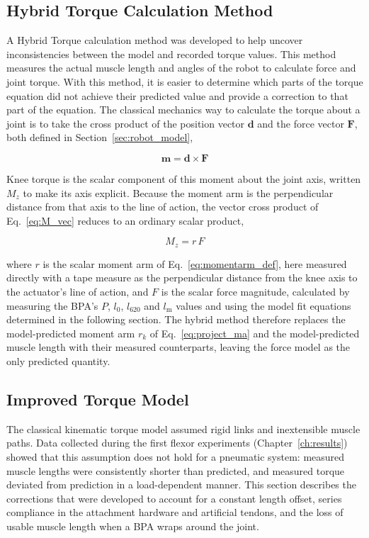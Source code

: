 \subsection{Hybrid Torque Calculation Method}\label{sec:hybrid_method}


A Hybrid Torque calculation method was developed to help uncover inconsistencies between the model and recorded torque values. This method measures the actual muscle length and angles of the robot to calculate force and joint torque. With this method, it is easier to determine which parts of the torque equation did not achieve their predicted value and provide a correction to that part of the equation. The classical mechanics way to calculate the torque about a joint is to take the cross product of the position vector $\mathbf{d}$ and the force vector $\mathbf{F}$, both defined in Section~\ref{sec:robot_model},

\begin{equation}
    \mathbf{m} = \mathbf{d} \times \mathbf{F} \label{eq:M_vec}
\end{equation}

Knee torque is the scalar component of this moment about the joint axis, written $M_{z}$ to make its axis explicit. Because the moment arm is the perpendicular distance from that axis to the line of action, the vector cross product of Eq.~\eqref{eq:M_vec} reduces to an ordinary scalar product,

\begin{equation}
    M_{z} = r\,F \label{eq:M_scalar}
\end{equation}

where $r$ is the scalar moment arm of Eq.~\eqref{eq:momentarm_def}, here measured directly with a tape measure as the perpendicular distance from the knee axis to the actuator's line of action, and $F$ is the scalar force magnitude, calculated by measuring the BPA's $P$, $l_{0}$, $l_{620}$ and $l_\text{m}$ values and using the model fit equations determined in the following section. The hybrid method therefore replaces the model-predicted moment arm $r_{k}$ of Eq.~\eqref{eq:project_ma} and the model-predicted muscle length with their measured counterparts, leaving the force model as the only predicted quantity.

\subsection{Improved Torque Model}\label{sec:improved_model}

The classical kinematic torque model assumed rigid links and inextensible muscle paths. Data collected during the first flexor experiments (Chapter~\ref{ch:results}) showed that this assumption does not hold for a pneumatic system: measured muscle lengths were consistently shorter than predicted, and measured torque deviated from prediction in a load-dependent manner. This section describes the corrections that were developed to account for a constant length offset, series compliance in the attachment hardware and artificial tendons, and the loss of usable muscle length when a BPA wraps around the joint.

